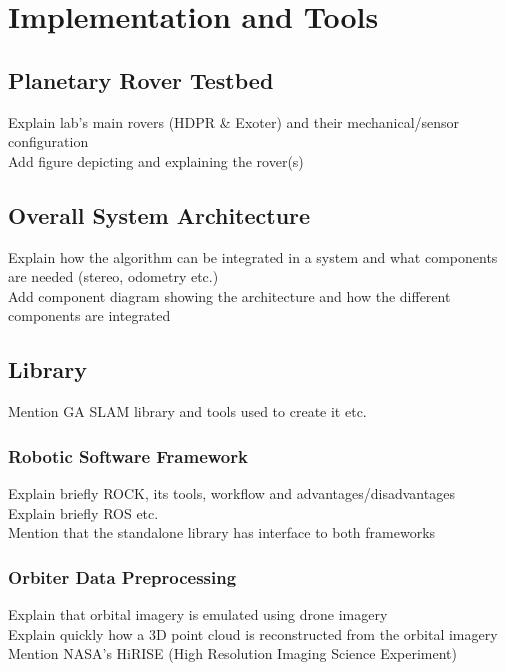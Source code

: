 \label{Chapter3}

\chapter{Implementation and Tools}

\section{Planetary Rover Testbed} \label{hdpr_rover}

Explain lab's main rovers (HDPR \& Exoter) and their mechanical/sensor configuration\\
Add figure depicting and explaining the rover(s)


\section{Overall System Architecture}

Explain how the algorithm can be integrated in a system and what components are needed (stereo, odometry etc.)\\
Add component diagram showing the architecture and how the different components are integrated

\section{Library}

Mention GA SLAM library and tools used to create it etc.

\subsection{Robotic Software Framework}

Explain briefly ROCK, its tools, workflow and advantages/disadvantages\\
Explain briefly ROS etc.\\
Mention that the standalone library has interface to both frameworks


\subsection{Orbiter Data Preprocessing}

Explain that orbital imagery is emulated using drone imagery\\
Explain quickly how a 3D point cloud is reconstructed from the orbital imagery\\
Mention NASA's HiRISE (High Resolution Imaging Science Experiment)

